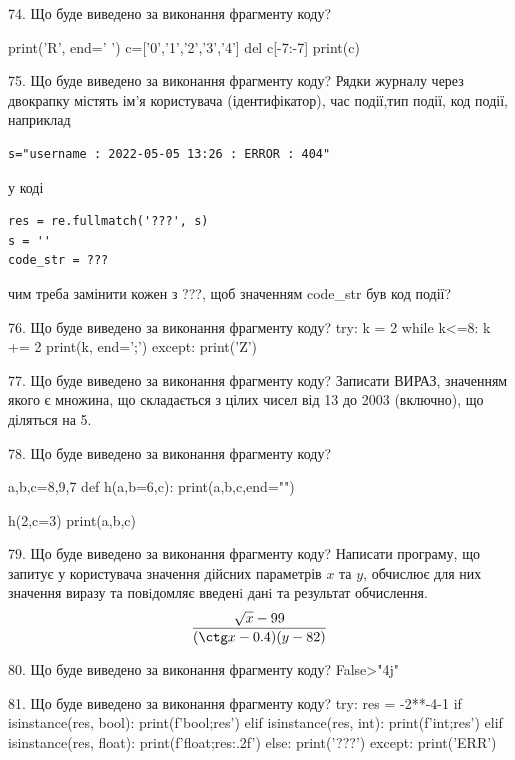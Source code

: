 \documentclass[11pt]{article}
\begin{document}
74. Що буде виведено за виконання фрагменту коду?

print('R', end=' ')
c=['0','1','2','3','4']
del c[-7:-7]
print(c)



75. Що буде виведено за виконання фрагменту коду?
Рядки журналу через двокрапку містять ім'я користувача (ідентифікатор), час події,тип події, код події, наприклад
\begin{verbatim}
s="username : 2022-05-05 13:26 : ERROR : 404"
\end{verbatim}
у коді 
\begin{verbatim}
res = re.fullmatch('???', s) 
s = ''
code_str = ??? 
\end{verbatim}
чим треба замінити кожен з ???, щоб значенням code\_str був код події? 




76. Що буде виведено за виконання фрагменту коду?
try:
    k = 2
    while k<=8:
        k += 2
    print(k, end=';')
except:
    print('Z')


77. Що буде виведено за виконання фрагменту коду?
Записати ВИРАЗ, значенням якого є множина, що складається з цілих чисел від 13 до 2003 (включно), що діляться на 5.

78. Що буде виведено за виконання фрагменту коду?

a,b,c=8,9,7
def h(a,b=6,c):
    print(a,b,c,end="")

h(2,c=3)
print(a,b,c)



79. Що буде виведено за виконання фрагменту коду?
Написати програму, що запитує у користувача значення дійсних параметрів $x$ та $y$, обчислює для них значення виразу та повiдомляє введенi данi та результат обчислення.
$$\frac{\sqrt x - 99}{(\ctg x - 0.4) (y - 82)}$$ 



80. Що буде виведено за виконання фрагменту коду?
False>"4j"

81. Що буде виведено за виконання фрагменту коду?
try:
    res = -2**-4-1
    if isinstance(res, bool):
        print(f'bool;{res}')
    elif isinstance(res, int):
        print(f'int;{res}')
    elif isinstance(res, float):
        print(f'float;{res:.2f}')
    else:
        print('???')
except:
    print('ERR')
\end{document}
